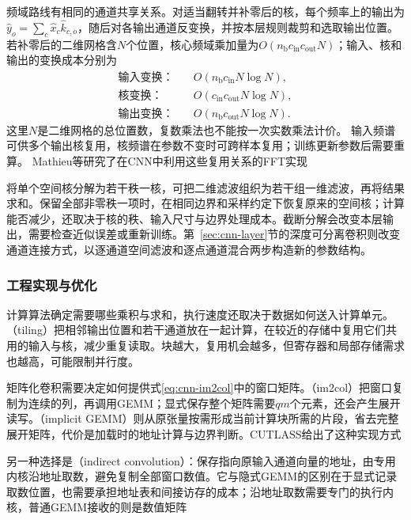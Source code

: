 频域路线有相同的通道共享关系。对适当翻转并补零后的核，每个频率上的输出为$\widehat y_o=\sum_c\widehat x_c\widehat k_{c,o}$，随后对各输出通道反变换，并按本层规则裁剪和选取输出位置。
若补零后的二维网格含$N$个位置，核心频域乘加量为$O(n_{\mathrm b}c_{\mathrm{in}}c_{\mathrm{out}}N)$；输入、核和输出的变换成本分别为
\begin{align*}
 \text{输入变换：}\quad &O(n_{\mathrm b}c_{\mathrm{in}}N\log N),\\
 \text{核变换：}\quad &O(c_{\mathrm{in}}c_{\mathrm{out}}N\log N),\\
 \text{输出变换：}\quad &O(n_{\mathrm b}c_{\mathrm{out}}N\log N).
\end{align*}
这里$N$是二维网格的总位置数，复数乘法也不能按一次实数乘法计价。
输入频谱可供多个输出核复用，核频谱在参数不变时可跨样本复用；训练更新参数后需要重算。
Mathieu等研究了在CNN中利用这些复用关系的FFT实现

将单个空间核分解为若干秩一核，可把二维滤波组织为若干组一维滤波，再将结果求和。保留全部非零秩一项时，在相同边界和采样约定下恢复原来的空间核；计算能否减少，还取决于核的秩、输入尺寸与边界处理成本。截断分解会改变本层输出，需要检查近似误差或重新训练。第~\ref{sec:cnn-layer}节的深度可分离卷积则改变通道连接方式，以逐通道空间滤波和逐点通道混合两步构造新的参数结构。

\subsubsection{工程实现与优化}
\label{sec:cnn-engineering}

计算算法确定需要哪些乘积与求和，执行速度还取决于数据如何送入计算单元。（tiling）把相邻输出位置和若干通道放在一起计算，在较近的存储中复用它们共用的输入与核，减少重复读取。块越大，复用机会越多，但寄存器和局部存储需求也越高，可能限制并行度。

矩阵化卷积需要决定如何提供式\eqref{eq:cnn-im2col}中的窗口矩阵。（im2col）把窗口复制为连续的列，再调用GEMM；显式保存整个矩阵需要$qm$个元素，还会产生展开读写。（implicit GEMM）则从原张量按需形成当前计算块所需的片段，省去完整展开矩阵，代价是加载时的地址计算与边界判断。CUTLASS给出了这种实现方式

另一种选择是（indirect convolution）：保存指向原输入通道向量的地址，由专用内核沿地址取数，避免复制全部窗口数值。它与隐式GEMM的区别在于显式记录取数位置，也需要承担地址表和间接访存的成本；沿地址取数需要专门的执行内核，普通GEMM接收的则是数值矩阵


